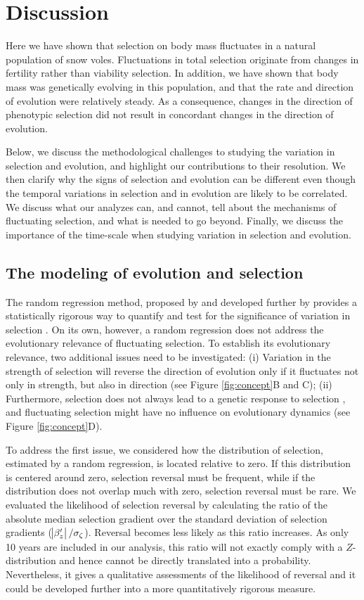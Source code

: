 \section*{Discussion}
Here we have shown that selection on body mass fluctuates in a natural population of snow voles. Fluctuations in total selection originate from changes in fertility rather than viability selection. 
In addition, we have shown that body mass was genetically evolving in this population, and that the rate and direction of evolution were relatively steady. As a consequence, changes in the direction of phenotypic selection did not result in concordant changes in the direction of evolution.

Below, we discuss the methodological challenges to studying the variation in selection and evolution, and highlight our contributions to their resolution. We then clarify why the signs of selection and evolution can be different even though the temporal variations in selection and in evolution are likely to be correlated. We discuss what our analyzes can, and cannot, tell about the mechanisms of fluctuating selection, and what is needed to go beyond. 
Finally, we discuss the importance of the time-scale when studying variation in selection and evolution.

\subsection*{The modeling of evolution and selection}
The random regression method, proposed by \cite{Morrissey2012flusel} and developed further by \cite{Chevin2015b} provides a statistically rigorous way to quantify and test for the significance of variation in selection \parencite{Chevin2015b}. On its own, however, a random regression does not address the evolutionary relevance of fluctuating selection. To establish its evolutionary relevance, two additional issues need to be investigated: (i) Variation in the strength of selection will reverse the direction of evolution only if it fluctuates not only in strength, but also in direction (see Figure \ref{fig:concept}B and C); (ii) Furthermore, selection does not always lead to a genetic response to selection \parencite{Rausher1992, Morrissey2010, Merila2001}, and fluctuating selection might have no influence on evolutionary dynamics (see Figure \ref{fig:concept}D).

To address the first issue, we considered how the distribution of selection, estimated by a random regression, is located relative to zero. If this distribution is centered around zero, selection reversal must be frequent, while if the distribution does not overlap much with zero, selection reversal must be rare.
We evaluated the likelihood of selection reversal by calculating the ratio of the absolute median selection gradient over the standard deviation of selection gradients ($\abs{\beta_{z}^\prime}/\sigma_\zeta$). Reversal becomes less likely as this ratio increases.
As only 10 years are included in our analysis, this ratio will not exactly comply with a $Z$-distribution and hence cannot be directly translated into a probability. Nevertheless, it gives a qualitative assessments of the likelihood of reversal and it could be developed further into a more quantitatively rigorous measure.

